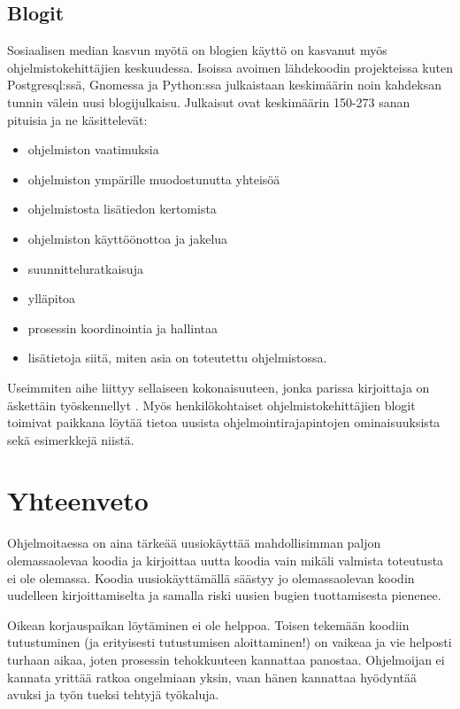 \documentclass[finnish]{tktltiki2}
\theoremstyle{definition}
\theoremstyle{remark}
\begin{document}
\subsection{Blogit}
Sosiaalisen median kasvun myötä on blogien käyttö on kasvanut myös ohjelmistokehittäjien keskuudessa. Isoissa avoimen lähdekoodin projekteissa kuten Postgresql:ssä, Gnomessa ja Python:ssa julkaistaan keskimäärin noin kahdeksan tunnin välein uusi blogijulkaisu. Julkaisut ovat keskimäärin 150-273 sanan pituisia ja ne käsittelevät:
\begin{itemize}
  \item ohjelmiston vaatimuksia
  \item ohjelmiston ympärille muodostunutta yhteisöä
  \item ohjelmistosta lisätiedon kertomista
  \item ohjelmiston käyttöönottoa ja jakelua
  \item suunnitteluratkaisuja
  \item ylläpitoa
  \item prosessin koordinointia ja hallintaa
  \item lisätietoja siitä, miten asia on toteutettu ohjelmistossa.
\end{itemize}

Useimmiten aihe liittyy sellaiseen kokonaisuuteen, jonka parissa kirjoittaja on äskettäin työskennellyt \cite{how-dev-blog}.
Myös henkilökohtaiset ohjelmistokehittäjien blogit toimivat paikkana löytää tietoa uusista ohjelmointirajapintojen ominaisuuksista sekä esimerkkejä niistä.

\section{Yhteenveto}
Ohjelmoitaessa on aina tärkeää uusiokäyttää mahdollisimman paljon olemassaolevaa koodia ja kirjoittaa uutta koodia vain mikäli valmista toteutusta ei ole olemassa. Koodia uusiokäyttämällä säästyy jo olemassaolevan koodin uudelleen kirjoittamiselta ja samalla riski uusien bugien tuottamisesta pienenee.

Oikean korjauspaikan löytäminen ei ole helppoa. Toisen tekemään koodiin tutustuminen (ja erityisesti tutustumisen aloittaminen!) on vaikeaa ja vie helposti turhaan aikaa, joten prosessin tehokkuuteen kannattaa panostaa. Ohjelmoijan ei kannata yrittää ratkoa ongelmiaan yksin, vaan hänen kannattaa hyödyntää avuksi ja työn tueksi tehtyjä työkaluja.
\end{document}
